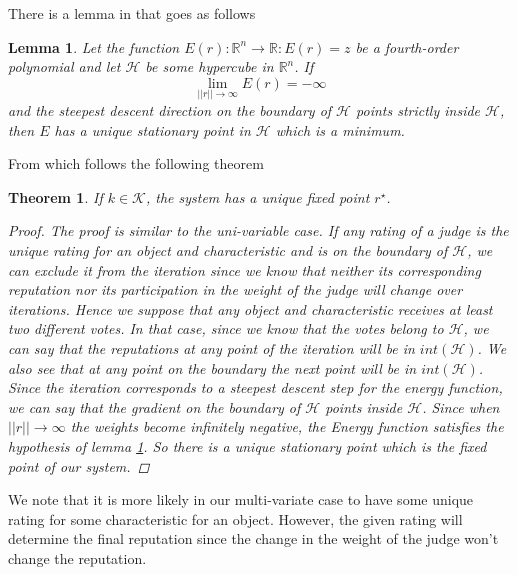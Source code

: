 \documentclass[12pt,a4paper]{article}
\newtheorem{lemma}{Lemma}
\newtheorem{theorem}{Theorem}
\begin{document}
There is a lemma in \cite{Cristo1} that goes as follows
\begin{lemma}
Let the function $E(r) : \mathbb{R}^n \rightarrow \mathbb{R} : E(r) = z $ be a fourth-order polynomial and let $\mathcal{H}$ be some hypercube in $\mathbb{R}^n$. If 
$$\lim_{||r||\rightarrow \infty} E(r) = - \infty $$
and the steepest descent direction on the boundary of $\mathcal{H}$ points strictly inside $\mathcal{H}$, then $E$ has a unique stationary point in $\mathcal{H}$ which is a minimum.
\label{eq:poly}
\end{lemma}
From which follows the following theorem
\begin{theorem}
If $k \in \mathcal{K}$, the system has a unique fixed point $r^{\star}$.\label{thm:uni}
\begin{proof}
The proof is similar to the uni-variable case. If any rating of a judge is the unique rating for an object and characteristic and is on the boundary of $\mathcal{H}$, we can exclude it from the iteration since we know that neither its corresponding reputation nor its participation in the weight of the judge will change over iterations. Hence we suppose that any object and characteristic receives at least two different votes. In that case, since we know that the votes belong to $\mathcal{H}$, we can say that the reputations at any point of the iteration will be in $int(\mathcal{H})$.
We also see that at any point on the boundary the next point will be in $int(\mathcal{H})$. Since the iteration corresponds to a steepest descent step for the energy function, we can say that the gradient on the boundary of $\mathcal{H}$ points inside $\mathcal{H}$. Since when $||r|| \rightarrow \infty$ the weights become infinitely negative, the Energy function satisfies the hypothesis of lemma \ref{eq:poly}. So there is a unique stationary point which is the fixed point of our system.
\end{proof}

\end{theorem}
We note that it is more likely in our multi-variate case to have some unique rating for some characteristic for an object. However, the given rating will determine the final reputation since the change in the weight of the judge won't change the reputation.
\end{document}
